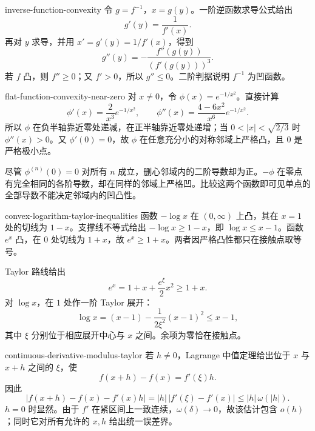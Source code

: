 \begin{solution}{inverse-function-convexity}
令 \(g=f^{-1}\)，\(x=g(y)\)。一阶逆函数求导公式给出
\[
 g'(y)=\frac1{f'(x)}.
\]
再对 \(y\) 求导，并用 \(x'=g'(y)=1/f'(x)\)，得到
\[
 g''(y)=-\frac{f''(g(y))}{(f'(g(y)))^3}.
\]
若 \(f\) 凸，则 \(f''\ge0\)；又 \(f'>0\)，所以 \(g''\le0\)。二阶判据说明 \(f^{-1}\) 为凹函数。
\end{solution}

\begin{solution}{flat-function-convexity-near-zero}
对 \(x\ne0\)，令 \(\phi(x)=e^{-1/x^2}\)。直接计算
\[
 \phi'(x)=\frac{2}{x^3}e^{-1/x^2},
 \qquad
 \phi''(x)=\frac{4-6x^2}{x^6}e^{-1/x^2}.
\]
所以 \(\phi\) 在负半轴靠近零处递减，在正半轴靠近零处递增；当 \(0<|x|<\sqrt{2/3}\) 时 \(\phi''(x)>0\)。又 \(\phi'(0)=0\)，故 \(\phi\) 在任意充分小的对称邻域上严格凸，且 \(0\) 是严格极小点。

尽管 \(\phi^{(n)}(0)=0\) 对所有 \(n\) 成立，删心邻域内的二阶导数却为正。\(-\phi\) 在零点有完全相同的各阶导数，却在同样的邻域上严格凹。比较这两个函数即可见单点的全部导数不能决定邻域内的凹凸性。
\end{solution}

\begin{solution}{convex-logarithm-taylor-inequalities}
函数 \(-\log x\) 在 \((0,\infty)\) 上凸，其在 \(x=1\) 处的切线为 \(1-x\)。支撑线不等式给出 \(-\log x\ge1-x\)，即 \(\log x\le x-1\)。函数 \(e^x\) 凸，在 \(0\) 处切线为 \(1+x\)，故 \(e^x\ge1+x\)。两者因严格凸性都只在接触点取等号。

Taylor 路线给出
\[
 e^x=1+x+\frac{e^\xi}{2}x^2\ge1+x.
\]
对 \(\log x\)，在 \(1\) 处作一阶 Taylor 展开：
\[
 \log x=(x-1)-\frac{1}{2\xi^2}(x-1)^2\le x-1,
\]
其中 \(\xi\) 分别位于相应展开中心与 \(x\) 之间。余项为零恰在接触点。
\end{solution}

\begin{solution}{continuous-derivative-modulus-taylor}
若 \(h\ne0\)，Lagrange 中值定理给出位于 \(x\) 与 \(x+h\) 之间的 \(\xi\)，使
\[
 f(x+h)-f(x)=f'(\xi)h.
\]
因此
\[
 |f(x+h)-f(x)-f'(x)h|
 =|h|\,|f'(\xi)-f'(x)|
 \le |h|\,\omega(|h|).
\]
\(h=0\) 时显然。由于 \(f'\) 在紧区间上一致连续，\(\omega(\delta)\to0\)，故该估计包含 \(o(h)\)；同时它对所有允许的 \(x,h\) 给出统一误差界。
\end{solution}

